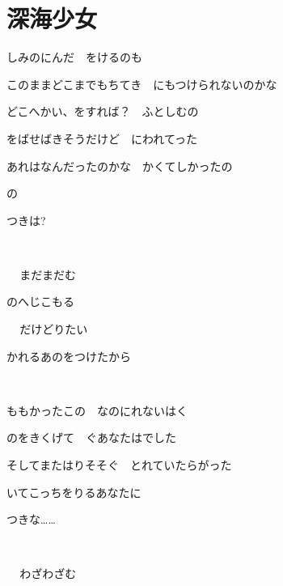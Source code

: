 \section{深海少女}

しみのにんだ　をけるのも

このままどこまでもちてき　にもつけられないのかな

どこへかい、をすれば？　ふとしむの

をばせばきそうだけど　にわれてった

あれはなんだったのかな　かくてしかったの

の

つきは?

~

\,　まだまだむ

のへじこもる

\,　だけどりたい

かれるあのをつけたから

~

ももかったこの　なのにれないはく

のをきくげて　ぐあなたはでした

そしてまたはりそそぐ　とれていたらがった

いてこっちをりるあなたに

つきな……

~

\,　わざわざむ

